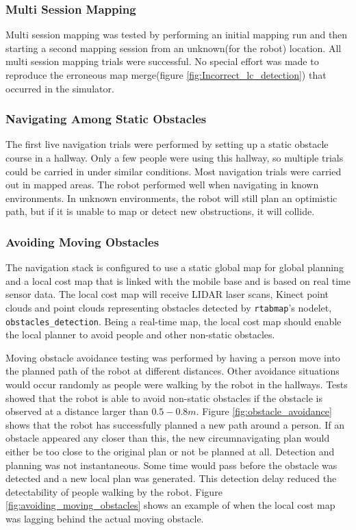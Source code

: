 \subsubsection{Multi Session Mapping}

Multi session mapping was tested by performing an initial mapping run and then starting a second mapping session from an unknown(for the robot) location. All multi session mapping trials were successful. No special effort was made to reproduce the erroneous map merge(figure \ref{fig:Incorrect_lc_detection}) that occurred in the simulator. 

\subsubsection{Navigating Among Static Obstacles}

The first live navigation trials were performed by setting up a static obstacle course in a hallway. Only a few people were using this hallway, so multiple trials could be carried in under similar conditions. Most navigation trials were carried out in mapped areas. The robot performed well when navigating in known environments. In unknown environments, the robot will still plan an optimistic path, but if it is unable to map or detect new obstructions, it will collide. 



\subsubsection{Avoiding Moving Obstacles}

The navigation stack is configured to use a static global map for global planning and a local cost map that is linked with the mobile base and is based on real time sensor data. The local cost map will receive LIDAR laser scans, Kinect point clouds and point clouds representing obstacles detected by \texttt{rtabmap}'s nodelet, \texttt{obstacles\_detection}. Being a real-time map, the local cost map should enable the local planner to avoid people and other non-static obstacles.

Moving obstacle avoidance testing was performed by having a person move into the planned path of the robot at different distances. Other avoidance situations would occur randomly as people were walking by the robot in the hallways. Tests showed that the robot is able to avoid non-static obstacles if the obstacle is observed at a distance larger than $0.5 - 0.8 m$. Figure \ref{fig:obstacle_avoidance} shows that the robot has successfully planned a new path around a person. If an obstacle appeared any closer than this, the new circumnavigating plan would either be too close to the original plan or not be planned at all. Detection and planning was not instantaneous. Some time would pass before the obstacle was detected and a new local plan was generated. This detection delay reduced the detectability of people walking by the robot. Figure \ref{fig:avoiding_moving_obstacles} shows an example of when the local cost map was lagging behind the actual moving obstacle.



